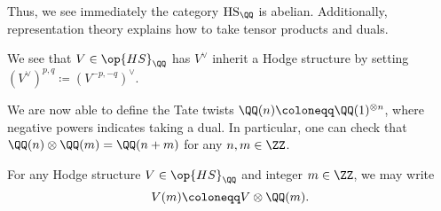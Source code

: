\documentclass[../thesis.tex]{subfiles}
\begin{document}
Thus, we see immediately the category $\mathrm{HS}_\QQ$ is abelian. Additionally, representation theory explains how to take tensor products and duals.
\begin{example}
	We see that $V\in\op{HS}_\QQ$ has $V^\lor$ inherit a Hodge structure by setting $(V^\lor)^{p,q}\coloneqq (V^{-p,-q})^\lor$.
\end{example}
\begin{example}
	We are now able to define the Tate twists $\QQ(n)\coloneqq\QQ(1)^{\otimes n}$, where negative powers indicates taking a dual. In particular, one can check that $\QQ(n)\otimes\QQ(m)=\QQ(n+m)$ for any $n,m\in\ZZ$.
\end{example}
\begin{notation}
	For any Hodge structure $V\in\op{HS}_\QQ$ and integer $m\in\ZZ$, we may write
	\[V(m)\coloneqq V\otimes\QQ(m).\]
\end{notation}
\end{document}
